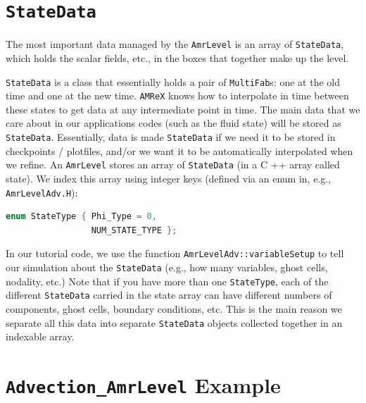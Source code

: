 \section{{\tt StateData}}

The most important data managed by the {\tt AmrLevel} is an array of {\tt StateData},
which holds the scalar fields, etc., in the boxes that together make up the level.

{\tt StateData} is a class that essentially holds a pair of {\tt MultiFab}s: one at the old time and one
at the new time. {\tt AMReX} knows how to interpolate in time between these states to get data at
any intermediate point in time. The main data that we care about in our applications codes 
(such as the fluid state) will be stored as {\tt StateData}. Essentially, data is made {\tt StateData}
if we need it to be stored in checkpoints / plotfiles, and/or we want it to be automatically
interpolated when we refine.
An {\tt AmrLevel} stores an array of {\tt StateData} (in a C ++ array called state). We index this array
using integer keys (defined via an enum in, e.g., {\tt AmrLevelAdv.H}):
\begin{lstlisting}[language=cpp]
enum StateType { Phi_Type = 0,
                 NUM_STATE_TYPE };
\end{lstlisting}
In our tutorial code, we use the function {\tt AmrLevelAdv::variableSetup} to tell our simulation about
the {\tt StateData} (e.g., how many variables, ghost cells, nodality, etc.)
Note that if you have more than one {\tt StateType}, each of the different {\tt StateData} 
carried in the state array can have different numbers
of components, ghost cells, boundary conditions, etc. This is the main reason we separate all this
data into separate {\tt StateData} objects collected together in an indexable array.

\section{{\tt Advection\_AmrLevel} Example}

